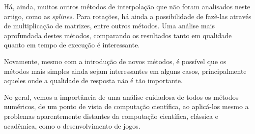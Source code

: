 \documentclass[12pt]{article}
\begin{document}
Há, ainda, muitos outros métodos de interpolação que não foram analisados neste artigo, como as \textit{splines}. Para rotações, há ainda a possibilidade de fazê-las através de multiplicação de matrizes, entre outros métodos. Uma análise mais aprofundada destes métodos, comparando os resultados tanto em qualidade quanto em tempo de execução é interessante.

Novamente, mesmo com a introdução de novos métodos, é possível que os métodos mais simples ainda sejam interessantes em alguns casos, principalmente aqueles onde a qualidade de resposta não é tão importante.

No geral, vemos a importância de uma análise cuidadosa de todos os métodos numéricos, de um ponto de vista de computação científica, ao aplicá-los mesmo a problemas aparentemente distantes da computação científica, clássica e acadêmica, como o desenvolvimento de jogos.

\printbibliography
\end{document}
